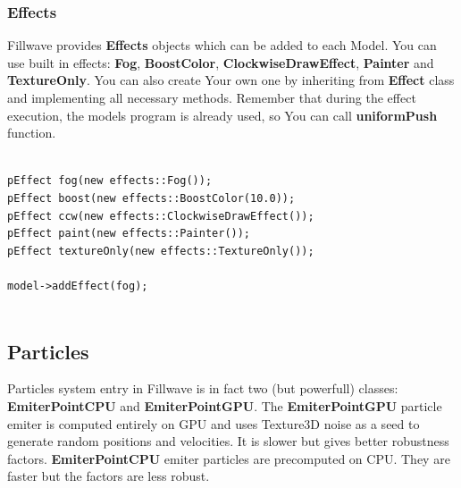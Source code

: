\documentclass{article}
\begin{document}
\subsubsection{Effects}\label{sec:Effects}
\indent \indent Fillwave provides \textbf{Effects} objects which can be added to each Model. You can use built in effects: \textbf{Fog}, \textbf{BoostColor}, \textbf{ClockwiseDrawEffect}, \textbf{Painter} and \textbf{TextureOnly}. You can also create Your own one by inheriting from \textbf{Effect} class and implementing all necessary methods. Remember that during the effect execution, the models program is already used, so You can call \textbf{uniformPush} function.

\begin{lstlisting}

pEffect fog(new effects::Fog());
pEffect boost(new effects::BoostColor(10.0));
pEffect ccw(new effects::ClockwiseDrawEffect());
pEffect paint(new effects::Painter());
pEffect textureOnly(new effects::TextureOnly());

model->addEffect(fog);
   
\end{lstlisting}

\subsection{Particles}\label{sec:Particles}
\indent \indent Particles system entry in Fillwave is in fact two (but powerfull) classes: \textbf{EmiterPointCPU} and \textbf{EmiterPointGPU}. The \textbf{EmiterPointGPU} particle emiter is computed entirely on GPU and uses Texture3D noise as a seed to generate random positions and velocities. It is slower but gives better robustness factors. \textbf{EmiterPointCPU} emiter particles are precomputed on CPU. They are faster but the factors are less robust.
\end{document}
